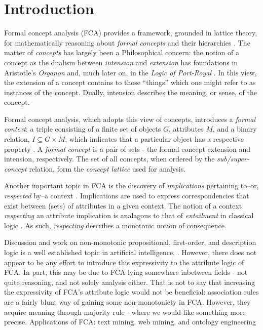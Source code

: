 \section{Introduction}
\label{section: introduction}

Formal concept analysis (FCA) provides a framework, grounded in lattice theory, for mathematically reasoning about \textit{formal concepts} and their hierarchies \cite{ganter1999formal,ganter2016conceptual,rudolph2007relational}. The matter of \textit{concepts} has largely been a Philosophical concern: the notion of a concept as the dualism between \textit{intension} and \textit{extension} has foundations in Aristotle's \textit{Organon} and, much later on, in the \textit{Logic of Port-Royal} \cite{rudolph2007relational,castonguay2012meaning}. In this view, the extension of a concept contains to those ``things'' which one might refer to as instances of the concept. Dually, intension describes the meaning, or sense, of the concept.

Formal concept analysis, which adopts this view of concepts, introduces a \textit{formal context}: a triple consisting of a finite set of objects $G$, attributes $M$, and a binary relation, $I \subseteq G\times M$, which indicates that a particular object has a respective property \cite{ganter1999formal,ganter2016conceptual}. A \textit{formal concept} is a pair of sets - the formal concept extension and intension, respectively. The set of all concepts, when ordered by the \textit{sub/super-concept} relation, form the \textit{concept lattice} used for analysis.

Another important topic in FCA is the discovery of \textit{implications} pertaining to–or, \textit{respected} by–a context \cite{rudolph2007relational,ganter1999formal}. Implications are used to express correspondencies that exist between (sets) of attributes in a given context. The notion of a context \textit{respecting} an attribute implication is analagous to that of \textit{entailment} in classical logic \cite{ganter2016conceptual}. As such, \textit{respecting} describes a monotonic notion of consequence.

Discussion and work on non-monotonic propositional, first-order, and description logic is a well established topic in artificial intelligence, \cite{ferguson2003monotonicity,giordano2015semantic,kraus1990nonmonotonic,lehmann1994what,shoham1987nonmonotonic}. However, there does not appear to be any effort to introduce this expressivity to the attribute logic of FCA. In part, this may be due to FCA lying somewhere inbetween fields - not quite reasoning, and not solely analysis either. That is not to say that increasing the expressivity of FCA's attribute logic would not be beneficial: association rules are a fairly blunt way of gaining some non-monotonicty in FCA. However, they acquire meaning through majority rule - where we would like something more precise.
Applications of FCA: text mining, web mining, and ontology engineering
